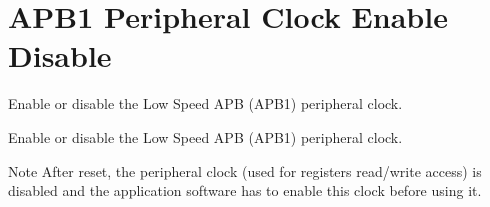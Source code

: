 \hypertarget{group___r_c_c_ex___a_p_b1___clock___enable___disable}{}\section{A\+P\+B1 Peripheral Clock Enable Disable}
\label{group___r_c_c_ex___a_p_b1___clock___enable___disable}


Enable or disable the Low Speed A\+PB (A\+P\+B1) peripheral clock.  


Enable or disable the Low Speed A\+PB (A\+P\+B1) peripheral clock. 

\begin{DoxyNote}{Note}
After reset, the peripheral clock (used for registers read/write access) is disabled and the application software has to enable this clock before using it. 
\end{DoxyNote}
